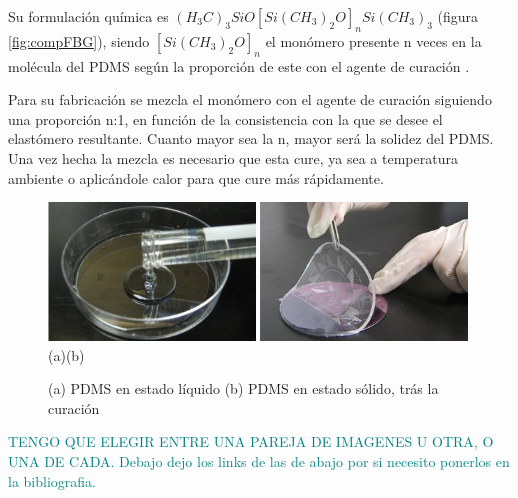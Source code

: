 	Su formulación química es $(H_{3}C)_{3}SiO[Si(CH_{3})_{2}O]_{n}Si(CH_{3})_{3}$ (figura \ref{fig:compFBG}), siendo $[Si(CH_{3})_{2}O]_{n}$ el monómero presente n veces en la molécula del PDMS según la proporción de este con el agente de curación \cite{propPDMS}.  	
 
 	Para su fabricación se mezcla el monómero con el agente de curación siguiendo una proporción n:1, en función de la consistencia con la que se desee el elastómero resultante. Cuanto mayor sea la n, mayor será la solidez del PDMS. Una vez hecha la mezcla es necesario que esta cure, ya sea a temperatura ambiente o aplicándole calor para que cure más rápidamente.
  
 	\begin{figure}[H]
	 	\centering
	 	\includegraphics[width=0.49\textwidth]{./img/liquidoPDMS}
	 	\includegraphics[width=0.49\textwidth]{./img/solidoPDMS} 
	 	\\(a)\hspace{7cm}(b)
	 	\caption{(a) PDMS en estado líquido \cite{liquidoPDMS} (b) PDMS en estado sólido, trás la curación \cite{solidoPDMS}} 
	 	\label{fig:slPDSM}
	 \end{figure}
  \textcolor{teal}{TENGO QUE ELEGIR ENTRE UNA PAREJA DE IMAGENES U OTRA, O UNA DE CADA. Debajo dejo los links de las de abajo por si necesito ponerlos en la bibliografia.\\}
